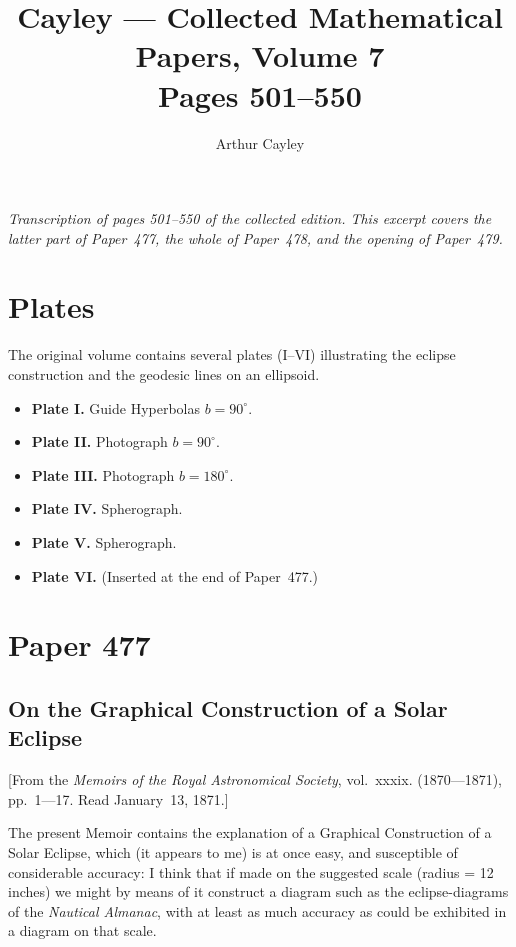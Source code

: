 \documentclass[11pt,a4paper]{article}
\title{Cayley --- Collected Mathematical Papers, Volume 7\\Pages 501--550}
\author{Arthur Cayley}
\date{}
\begin{document}
\maketitle
\thispagestyle{empty}

\noindent\textit{Transcription of pages 501--550 of the collected edition. This excerpt covers the latter part of Paper~477, the whole of Paper~478, and the opening of Paper~479.}

\tableofcontents
\newpage

\section*{Plates}

The original volume contains several plates (I--VI) illustrating the eclipse construction and the geodesic lines on an ellipsoid.

\begin{itemize}
\item \textbf{Plate I.} Guide Hyperbolas $b=90^{\circ}$.
\item \textbf{Plate II.} Photograph $b=90^{\circ}$.
\item \textbf{Plate III.} Photograph $b=180^{\circ}$.
\item \textbf{Plate IV.} Spherograph.
\item \textbf{Plate V.} Spherograph.
\item \textbf{Plate VI.} (Inserted at the end of Paper~477.)
\end{itemize}

\newpage

\section*{Paper 477}

\subsection*{On the Graphical Construction of a Solar Eclipse}

\begin{center}
[From the \textit{Memoirs of the Royal Astronomical Society}, vol.~xxxix. (1870---1871), pp.~1---17. Read January~13, 1871.]
\end{center}

The present Memoir contains the explanation of a Graphical Construction of a Solar Eclipse, which (it appears to me) is at once easy, and susceptible of considerable accuracy: I think that if made on the suggested scale (radius = 12 inches) we might by means of it construct a diagram such as the eclipse-diagrams of the \textit{Nautical Almanac}, with at least as much accuracy as could be exhibited in a diagram on that scale.
\end{document}

